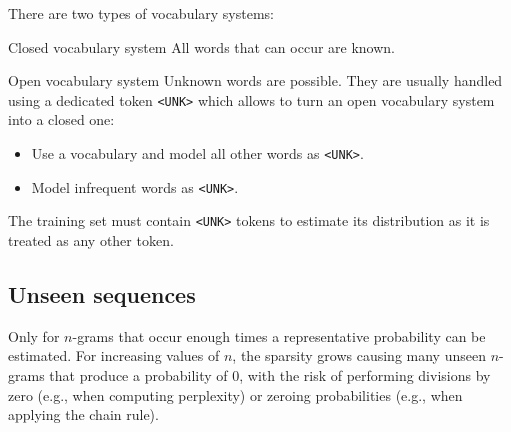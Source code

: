 There are two types of vocabulary systems:
\begin{descriptionlist}
    \item[Closed vocabulary system] 
        All words that can occur are known.

    \item[Open vocabulary system] 
        Unknown words are possible. They are usually handled using a dedicated token \texttt{<UNK>} which allows to turn an open vocabulary system into a closed one:
        \begin{itemize}
            \item Use a vocabulary and model all other words as \texttt{<UNK>}.
            \item Model infrequent words as \texttt{<UNK>}.
        \end{itemize}

        \begin{remark}
            The training set must contain \texttt{<UNK>} tokens to estimate its distribution as it is treated as any other token.
        \end{remark}
\end{descriptionlist}


\subsection{Unseen sequences}

Only for $n$-grams that occur enough times a representative probability can be estimated. For increasing values of $n$, the sparsity grows causing many unseen $n$-grams that produce a probability of $0$, with the risk of performing divisions by zero (e.g., when computing perplexity) or zeroing probabilities (e.g., when applying the chain rule).


